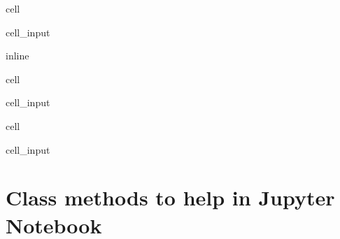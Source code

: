 \documentclass[letterpaper,10pt,english]{jupyterBook}
\begin{document}
\begin{sphinxuseclass}{cell}\begin{sphinxVerbatimInput}

\begin{sphinxuseclass}{cell_input}
\begin{sphinxVerbatim}[commandchars=\\\{\}]
 inline
\end{sphinxVerbatim}

\end{sphinxuseclass}\end{sphinxVerbatimInput}

\end{sphinxuseclass}
\begin{sphinxuseclass}{cell}\begin{sphinxVerbatimInput}

\begin{sphinxuseclass}{cell_input}
\begin{sphinxVerbatim}[commandchars=\\\{\}]
    
\end{sphinxVerbatim}

\end{sphinxuseclass}\end{sphinxVerbatimInput}

\end{sphinxuseclass}
\begin{sphinxuseclass}{cell}\begin{sphinxVerbatimInput}

\begin{sphinxuseclass}{cell_input}
\begin{sphinxVerbatim}[commandchars=\\\{\}]
    
\end{sphinxVerbatim}

\end{sphinxuseclass}\end{sphinxVerbatimInput}

\end{sphinxuseclass}

\section{Class methods to help in Jupyter Notebook}
\label{\detokenize{content/Python/modelflow_features:class-methods-to-help-in-jupyter-notebook}}
\end{document}
